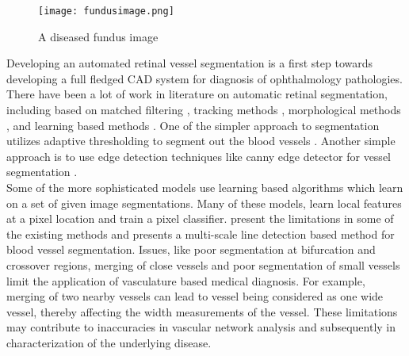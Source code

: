\begin{figure}
	\centering	
	\texttt{[image: fundusimage.png]}
	\caption{A diseased fundus image}
	\label{fig:fundusdiseased}		
\end{figure}	

Developing an automated retinal vessel segmentation is a first step towards developing a full fledged CAD system for diagnosis of ophthalmology pathologies. There have been a lot of work in literature on automatic retinal segmentation, including based on matched filtering \cite{zana2001segmentation,hoover2000locating,al2007improved}, tracking methods \cite{mendonca2006segmentation,chutatape1998retinal}, morphological methods \cite{leandro2001blood,walter2001segmentation}, and learning based methods \cite{sopharak2010machine,fuller2007segmentation,niemeijer2007automated}. One of the simpler approach to segmentation utilizes adaptive thresholding to segment out the blood vessels \cite{jiang2003adaptive}. Another simple approach is to use edge detection techniques like canny edge detector for vessel segmentation \cite{chrastek2002optic}.\\

Some of the more sophisticated models use learning based algorithms which learn on a set of given image segmentations. Many of these models, learn local features at a pixel location and train a pixel classifier. \citet{nguyen2011effective} present the limitations in some of the existing methods and presents a multi-scale line detection based method for blood vessel segmentation. Issues, like poor segmentation at bifurcation and crossover regions, merging of close vessels and poor segmentation of small vessels limit the application of vasculature based medical diagnosis. For example, merging of two nearby vessels can lead to vessel being considered as one wide vessel, thereby affecting the width measurements of the vessel. These limitations may contribute to inaccuracies in vascular network analysis and subsequently in characterization of the underlying disease. \\


